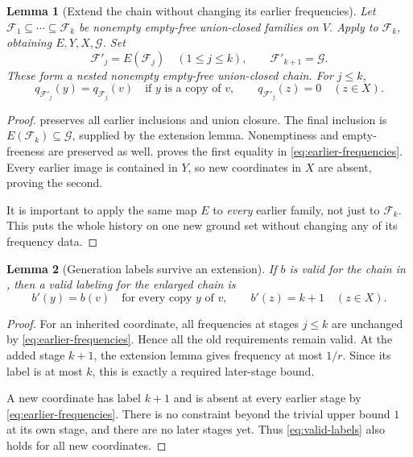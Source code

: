 \documentclass[11pt]{article}
\newtheorem{lemma}[lemma]{Lemma}
\newcommand{\<}{\langle}
\renewcommand{\>}{\rangle}
\newcommand{\F}{\mathcal{F}}
\newcommand{\G}{\mathcal{G}}
\numberwithin{equation}{section}
\begin{document}
\begin{lemma}[Extend the chain without changing its earlier frequencies]
\label{lem:extend-chain}
Let $\F_1\subseteq\cdots\subseteq\F_k$ be nonempty empty-free union-closed
families on $V$. Apply  to $\F_k$, obtaining $E,Y,X,\G$.
Set
\[
 \F'_j=E(\F_j)\quad(1\le j\le k),\qquad \F'_{k+1}=\G.
\]
These form a nested nonempty empty-free union-closed chain. For $j\le k$,
\begin{equation}\label{eq:earlier-frequencies}
 q_{\F'_j}(y)=q_{\F_j}(v)\quad\text{if $y$ is a copy of $v$},\qquad
 q_{\F'_j}(z)=0\quad(z\in X).
\end{equation}
\end{lemma}
\begin{proof}
 preserves all earlier inclusions and union
closure. The final inclusion is $E(\F_k)\subseteq\G$, supplied by the
extension lemma. Nonemptiness and empty-freeness are preserved as well.
 proves the first equality in
\eqref{eq:earlier-frequencies}. Every earlier image is contained in $Y$, so
new coordinates in $X$ are absent, proving the second.

It is important to apply the same map $E$ to \emph{every} earlier family,
not just to $\F_k$. This puts the whole history on one new ground set without
changing any of its frequency data.
\end{proof}

\begin{lemma}[Generation labels survive an extension]\label{lem:labels}
If $b$ is valid for the chain in , then a valid
labeling for the enlarged chain is
\[
 b'(y)=b(v)\quad\text{for every copy $y$ of $v$},\qquad
 b'(z)=k+1\quad(z\in X).
\]
\end{lemma}
\begin{proof}
For an inherited coordinate, all frequencies at stages $j\le k$ are
unchanged by \eqref{eq:earlier-frequencies}. Hence all the old requirements
remain valid. At the added stage $k+1$, the extension lemma gives frequency
at most $1/r$. Since its label is at most $k$, this is exactly a required
later-stage bound.

A new coordinate has label $k+1$ and is absent at every earlier stage by
\eqref{eq:earlier-frequencies}. There is no constraint beyond the trivial
upper bound $1$ at its own stage, and there are no later stages yet. Thus
\eqref{eq:valid-labels} also holds for all new coordinates.
\end{proof}
\end{document}
